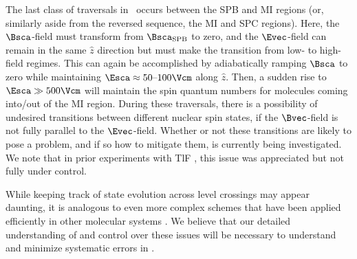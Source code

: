 The last class of traversals in \CENTREX\ occurs between the SPB and MI regions (or, similarly aside from the reversed sequence, the MI and SPC regions).  Here, the $\Bsca$-field must transform from $\Bsca_{\rm SPB}$ to zero, and the $\Evec$-field can remain in the same $\hat{z}$ direction but must make the transition from low- to high-field regimes.  This can again be accomplished by adiabatically ramping $\Bsca$ to zero while maintaining $\Esca \approx \hbox{50--100} \Vcm$ along $\hat{z}$.  Then, a sudden rise to $\Esca \gg 500 \Vcm$ will maintain the spin quantum numbers for molecules coming into/out of the MI region. During these traversals, there is a possibility of undesired transitions between different nuclear spin states, if the $\Bvec$-field is not fully parallel to the $\Evec$-field. Whether or not these transitions are likely to pose a problem, and if so how to mitigate them, is currently being investigated. We note that in prior experiments with TlF \cite{wilkening1984search,cho1991tight}, this issue was appreciated but not fully under control.
                       
While keeping track of state evolution across level crossings may appear daunting, it is analogous to even more complex schemes that have been applied efficiently in other molecular systems \cite{langheckerdenschlag2008}. We believe that our detailed understanding of and control over these issues will be necessary to understand and minimize systematic errors in \CENTREX.
